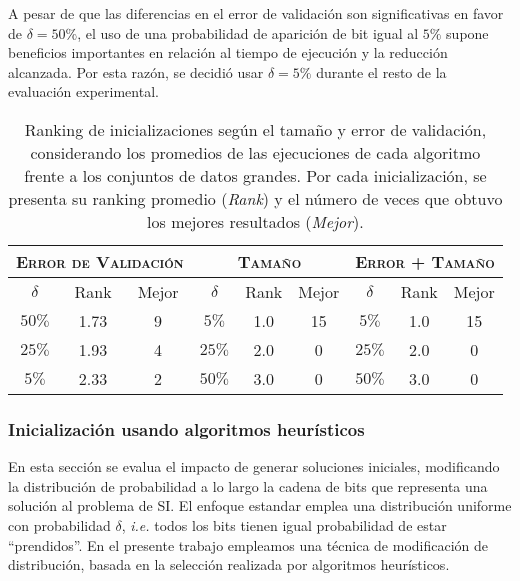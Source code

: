 A pesar de que las diferencias en el error de validación son significativas en favor de $\delta = 50\%$, el uso de una probabilidad de aparición de bit igual al $5\%$ supone beneficios importantes en relación al tiempo de ejecución y la reducción alcanzada. Por esta razón, se decidió usar $\delta = 5\%$ durante el resto de la evaluación experimental.

\begin{table}[h!]
\centering
\begin{tabular}{c c c|c c c|c c c}
\hline
\multicolumn{3}{c|}{\textsc{Error de Validación}}
	& \multicolumn{3}{c|}{\textsc{Tamaño}}
	& \multicolumn{3}{c}{\textsc{Error + Tamaño}} \\
\hline
$\delta$ & Rank & Mejor & $\delta$ & Rank & Mejor & $\delta$ & Rank & Mejor \\
\hline
\hline
$50\%$ & 1.73 & 9 & $5\%$  & 1.0 & 15 & $5\%$  & 1.0 & 15 \\
$25\%$ & 1.93 & 4 & $25\%$ & 2.0 &  0 & $25\%$ & 2.0 &  0 \\
$5\%$  & 2.33 & 2 & $50\%$ & 3.0 &  0 & $50\%$ & 3.0 &  0 \\
\hline
\end{tabular}
\caption[Ranking de probabilidad de bit $\delta$ según el tamaño y error de validación]{Ranking de inicializaciones según el tamaño y error de validación, considerando los promedios de las ejecuciones de cada algoritmo frente a los conjuntos de datos grandes. Por cada inicialización, se presenta su ranking promedio (\emph{Rank}) y el número de veces que obtuvo los mejores resultados (\emph{Mejor}).}
\label{table-unif-rank}
\end{table}

\subsubsection{Inicialización usando algoritmos heurísticos}

En esta sección se evalua el impacto de generar soluciones iniciales, modificando la distribución de probabilidad a lo largo la cadena de bits que representa una solución al problema de SI. El enfoque estandar emplea una distribución uniforme con probabilidad $\delta$, \emph{i.e.} todos los bits tienen igual probabilidad de estar ``prendidos''. En el presente trabajo empleamos una técnica de modificación de distribución, basada en la selección realizada por algoritmos heurísticos.

